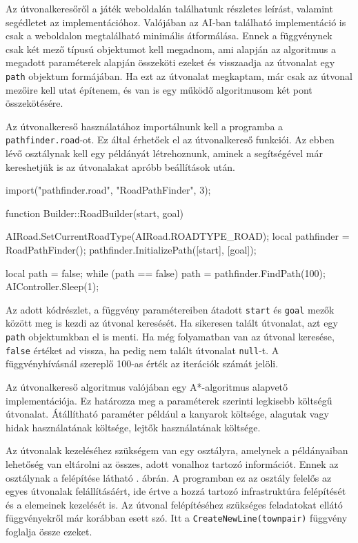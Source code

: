 Az útvonalkeresőről a játék weboldalán találhatunk részletes leírást, valamint segédletet az implementációhoz. Valójában az AI-ban található implementáció is csak a weboldalon megtalálható minimális átformálása. Ennek a függvénynek csak két mező típusú objektumot kell megadnom, ami alapján az algoritmus a megadott paraméterek alapján összeköti ezeket és visszaadja az útvonalat egy \texttt{path} objektum formájában. Ha ezt az útvonalat megkaptam, már csak az útvonal mezőire kell utat építenem, és van is egy működő algoritmusom két pont összekötésére.

Az útvonalkereső használatához importálnunk kell a programba a \\ \texttt{pathfinder.road}-ot. Ez által érhetőek el az útvonalkereső funkciói. Az ebben lévő osztálynak kell egy példányát létrehoznunk, aminek a segítségével már kereshetjük is az útvonalakat apróbb beállítások után.

\begin{cpp}
import("pathfinder.road", "RoadPathFinder", 3);

function Builder::RoadBuilder(start, goal) {
  AIRoad.SetCurrentRoadType(AIRoad.ROADTYPE_ROAD);
  local pathfinder = RoadPathFinder();
  pathfinder.InitializePath([start], [goal]);
  
  local path = false;
  while (path == false) {
    path = pathfinder.FindPath(100);
    AIController.Sleep(1);
  }
}
\end{cpp}
Az adott kódrészlet, a függvény paramétereiben átadott \texttt{start} és \texttt{goal} mezők között meg is kezdi az útvonal keresését. Ha sikeresen talált útvonalat, azt egy \texttt{path} objektumkban el is menti. Ha még folyamatban van az útvonal keresése, \texttt{false} értéket ad vissza, ha pedig nem talált útvonalat \texttt{null}-t. A függvényhívásnál szereplő 100-as érték az iterációk számát jelöli.

Az útvonalkereső algoritmus valójában egy A*-algoritmus alapvető implementációja. Ez határozza meg a paraméterek szerinti legkisebb költségű útvonalat. Átállítható paraméter például a kanyarok költsége, alagutak vagy hidak használatának költsége, lejtők használatának költsége.


Az útvonalak kezeléséhez szükségem van egy osztályra, amelynek a példányaiban lehetőség van eltárolni az összes, adott vonalhoz tartozó információt. Ennek az osztálynak a felépítése látható . ábrán. A programban ez az osztály felelős az egyes útvonalak felállításáért, ide értve a hozzá tartozó infrastruktúra felépítését és a elemeinek kezelését is. Az útvonal felépítéséhez szükséges feladatokat ellátó függvényekről már korábban esett szó. Itt a \texttt{CreateNewLine(townpair)} függvény foglalja össze ezeket.

